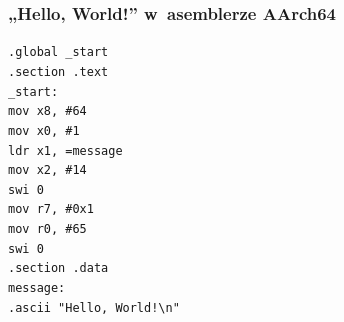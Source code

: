 \documentclass[10pt,t]{beamer}
\begin{document}
\begin{frame}

  \frametitle{„Hello, World!” w~asemblerze AArch64
    \parencite{Low-Level-You-Can-Learn-AArch64-ETC-Ver-2020}}


  \texttt{.global \_start} \\
  \texttt{.section .text} \\



  \texttt{\_start:} \\[-0.2em]
  \hphantom{aaaaaaaa} \texttt{mov x8, \#64} \\
  \hphantom{aaaaaaaa} \texttt{mov x0, \#1} \\
  \hphantom{aaaaaaaa} \texttt{ldr x1, =message} \\
  \hphantom{aaaaaaaa} \texttt{mov x2, \#14} \\

  \hphantom{aaaaaaaa} \texttt{swi 0} \\

  \hphantom{aaaaaaaa} \texttt{mov r7, \#0x1} \\
  \hphantom{aaaaaaaa} \texttt{mov r0, \#65} \\

  \hphantom{aaaaaaaa} \texttt{swi 0} \\



  \texttt{.section .data} \\
  \texttt{message:} \\
  \hphantom{aaaaaaaa} \texttt{.ascii "Hello, World!\textbackslash n"}

\end{frame}
\end{document}
